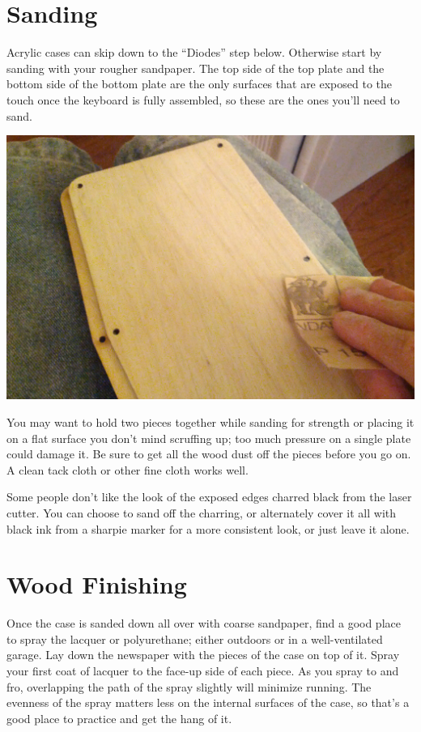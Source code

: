 \documentclass[landscape,twocolumn]{article}
\begin{document}
\section{Sanding}

Acrylic cases can skip down to the ``Diodes'' step below. Otherwise
start by sanding with your rougher sandpaper. The top side of the top
plate and the bottom side of the bottom plate are the only surfaces
that are exposed to the touch once the keyboard is fully assembled, so
these are the ones you'll need to sand.

\vspace{1em}
\begin{center}
  \includegraphics[width=0.7\columnwidth]{sanding.jpg}
\end{center}
\vspace{1em}

You may want to hold two pieces together while sanding for strength or
placing it on a flat surface you don't mind scruffing up; too much
pressure on a single plate could damage it. Be sure to get all the
wood dust off the pieces before you go on. A clean tack cloth or other
fine cloth works well.

\vspace{1em}

Some people don't like the look of the exposed edges charred black
from the laser cutter. You can choose to sand off the charring, or
alternately cover it all with black ink from a sharpie marker for a
more consistent look, or just leave it alone.

\section{Wood Finishing}

Once the case is sanded down all over with coarse sandpaper, find a
good place to spray the lacquer or polyurethane; either outdoors or in
a well-ventilated garage. Lay down the newspaper with the pieces of
the case on top of it. Spray your first coat of lacquer to the face-up
side of each piece. As you spray to and fro, overlapping the path of
the spray slightly will minimize running. The evenness of the spray
matters less on the internal surfaces of the case, so that's a good
place to practice and get the hang of it.
\end{document}
